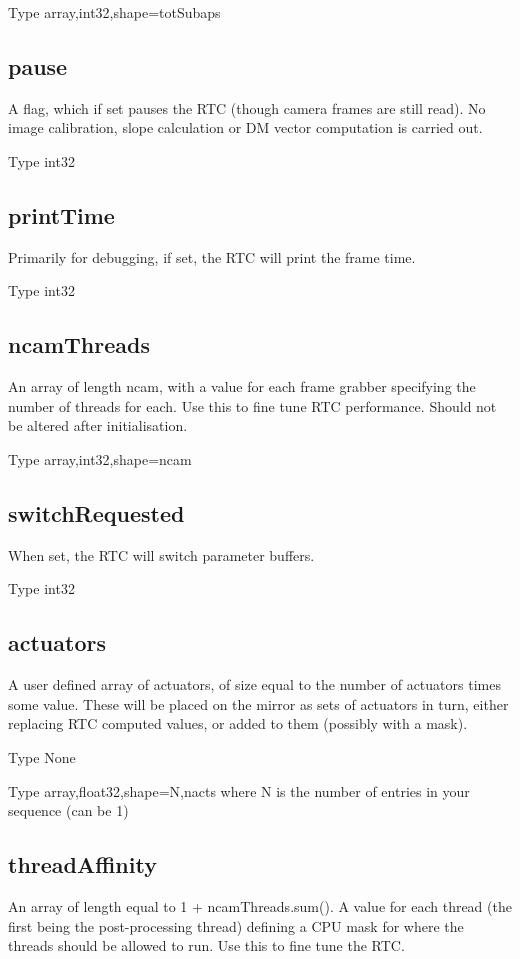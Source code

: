 \documentclass[a4,10pt]{article}
\begin{document}
Type array,int32,shape=totSubaps

\subsection{pause}
A flag, which if set pauses the RTC (though camera frames are still
read).  No image calibration, slope calculation or DM vector
computation is carried out.

Type int32

\subsection{printTime}
Primarily for debugging, if set, the RTC will print the frame time.

Type int32

\subsection{ncamThreads}
An array of length ncam, with a value for each frame grabber
specifying the number of threads for each.  Use this to fine tune RTC
performance.  Should not be altered after initialisation.

Type array,int32,shape=ncam

\subsection{switchRequested}
When set, the RTC will switch parameter buffers.

Type int32

\subsection{actuators}
A user defined array of actuators, of size equal to the number of
actuators times some value.  These will be placed on the mirror as
sets of actuators in turn, either replacing RTC
computed values, or added to them (possibly with a mask).

Type None

Type array,float32,shape=N,nacts where N is the number of entries in
your sequence (can be 1)


\subsection{threadAffinity}
An array of length equal to 1 + ncamThreads.sum().  A value for each
thread (the first being the post-processing thread) defining a CPU
mask for where the threads should be allowed to run.  Use this to fine
tune the RTC.
\end{document}
